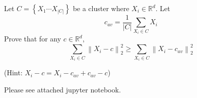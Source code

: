 \documentclass[11pt]{article}
\newenvironment{problem}[2][Problem]{\begin{trivlist}
\item[\hskip \labelsep {\bfseries #1}\hskip \labelsep {\bfseries #2.}]}{\end{trivlist}}
\begin{document}
\begin{problem}{3. (15 points)}
Let $C = \left \lbrace X_1 \cdots X_{|C|} \right \rbrace$ be a cluster where $X_i \in \mathbb{R}^d$. Let 
\[ c_{av} = \frac{1}{|C|} \sum\limits_{X_i \in C} X_i \] 
Prove that for any $c \in \mathbb{R}^d$,
\[ \sum\limits_{X_i \in C} \left \lVert X_i - c \right \rVert_2^2 \geq \sum\limits_{X_i \in C} \left \lVert X_i - c_{av} \right \rVert_2^2 \]

(Hint: $X_i - c = X_i - c_{av} + c_{av} -c$)
\end{problem} 

\begin{problem}{4. (30 points)}
Please see attached jupyter notebook.
\end{problem}
\end{document}
